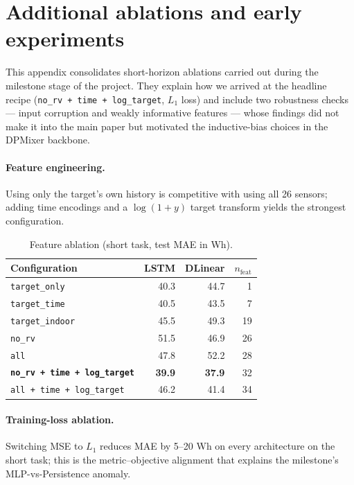 \documentclass{article}
\begin{document}
\section{Additional ablations and early experiments}
\label{si:additional}

This appendix consolidates short-horizon ablations carried out during
the milestone stage of the project. They explain how we arrived at the
headline recipe (\texttt{no\_rv + time + log\_target}, $L_1$ loss) and
include two robustness checks --- input corruption and weakly
informative features --- whose findings did not make it into the main
paper but motivated the inductive-bias choices in the DPMixer
backbone.

\paragraph{Feature engineering.}
Using only the target's own history is competitive with using all 26
sensors; adding time encodings and a $\log(1+y)$ target transform
yields the strongest configuration.

\begin{table}[h]
\centering
\small
\caption{Feature ablation (short task, test MAE in Wh).}
\label{tab:feat}
\begin{tabular}{lrrr}
\toprule
Configuration & LSTM & DLinear & $n_{\text{feat}}$ \\
\midrule
\texttt{target\_only}                           & 40.3 & 44.7 & 1  \\
\texttt{target\_time}                           & 40.5 & 43.5 & 7  \\
\texttt{target\_indoor}                         & 45.5 & 49.3 & 19 \\
\texttt{no\_rv}                                 & 51.5 & 46.9 & 26 \\
\texttt{all}                                    & 47.8 & 52.2 & 28 \\
\textbf{\texttt{no\_rv + time + log\_target}}   & \textbf{39.9} & \textbf{37.9} & 32 \\
\texttt{all + time + log\_target}               & 46.2 & 41.4 & 34 \\
\bottomrule
\end{tabular}
\end{table}

\paragraph{Training-loss ablation.}
Switching MSE to $L_1$ reduces MAE by 5--20 Wh on every architecture
on the short task; this is the metric--objective alignment that
explains the milestone's MLP-vs-Persistence anomaly.
\end{document}

